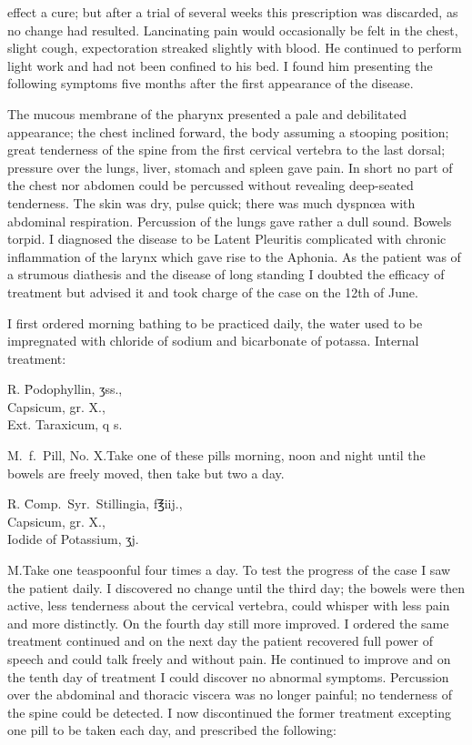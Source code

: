 effect a cure; but after a trial of several weeks this prescription was
discarded, as no change had resulted. Lancinating pain would occasionally
be felt in the chest, slight cough, expectoration streaked slightly
with blood. He continued to perform light work and had not been
confined to his bed. I found him presenting the following symptoms
five months after the first appearance of the disease.

The mucous membrane of the pharynx presented a pale and debilitated
appearance; the chest inclined forward, the body assuming a
stooping position; great tenderness of the spine from the first cervical
vertebra to the last dorsal; pressure over the lungs, liver, stomach
and spleen gave pain. In short no part of the chest nor abdomen
could be percussed without revealing deep-seated tenderness. The
skin was dry, pulse quick; there was much dyspnœa with abdominal
respiration. Percussion of the lungs gave rather a dull sound. Bowels
torpid. I diagnosed the disease to be Latent Pleuritis complicated
with chronic inflammation of the larynx which gave rise to the Aphonia.
As the patient was of a strumous diathesis and the disease of long standing
I doubted the efficacy of treatment but advised it and took charge
of the case on the 12th of June.

I first ordered morning bathing to be practiced daily, the water used
to be impregnated with chloride of sodium and bicarbonate of potassa.
Internal treatment:

\begin{center}
\begin{tabbing}
  \textsf{℞}. \= Podophyllin, \textsf{ʒ}ss., \\
    \> Capsicum, gr. X., \\
    \> Ext. Taraxicum, q s.
\end{tabbing}
\end{center}
M.\ f.\ Pill, No. X.\quad{}Take one of these pills morning, noon and night
until the bowels are freely moved, then take but two a day.
\begin{center}
\begin{tabbing}
  \textsf{℞}. \= Comp.\ Syr.\ Stillingia, f\textsf{℥}iij., \\
    \> Capsicum, gr. X., \\
    \> Iodide of Potassium, \textsf{ʒ}j.
\end{tabbing}
\end{center}
M.\quad{}Take one teaspoonful four times a day. To test the progress of
the case I saw the patient daily. I discovered no change until the third
day; the bowels were then active, less tenderness about the cervical
vertebra, could whisper with less pain and more distinctly. On the
fourth day still more improved. I ordered the same treatment continued
and on the next day the patient recovered full power of speech and could
talk freely and without pain. He continued to improve and on the tenth
day of treatment I could discover no abnormal symptoms. Percussion
over the abdominal and thoracic viscera was no longer painful; no tenderness
of the spine could be detected. I now discontinued the former
treatment excepting one pill to be taken each day, and prescribed the
following:\endinput
